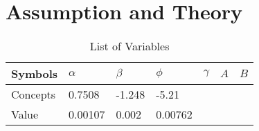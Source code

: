 \documentclass[../Paper.tex]{subfiles}
\begin{document}
\section{Assumption and Theory}

\renewcommand\arraystretch{1.5} %
\begin{table}[H]
\centering
\scriptsize %
\begin{tabular}{p{2.5cm}<{\centering} p{1cm}<{\centering} p{1cm}<{\centering} p{1cm}<{\centering} p{1cm}<{\centering} 
				p{1cm}<{\centering} p{1cm}<{\centering} }
		\hline
Symbols & $\alpha$ & $\beta$ & $\phi$ & $\gamma$ & $A$ & $B$ \\
	    \hline
	    \hline 
Concepts & 0.7508 & -1.248 & -5.21 &  &  &  \\
		
Value & 0.00107 & 0.002 & 0.00762 &  &  & \\
	    \hline
\end{tabular}

\caption{ List of Variables}
\label{Table1}
\end{table}
\end{document}
